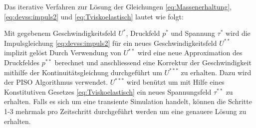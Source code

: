 Das iterative Verfahren zur Lösung der Gleichungen \eqref{eq:Massenerhaltung}, \eqref{eq:devss:impuls2} und \eqref{eq:Tviskoelastisch} lautet wie folgt:
\begin{outline}
    \1 Mit gegebenem Geschwindigkeitsfeld $U^*$, Druckfeld $p^*$ und Spannung $\tau^*$ wird die Impulsgleichung \eqref{eq:devss:impuls2} für ein neues Geschwindigkeitsfeld $U^{**}$ implizit gelöst
    \1 Durch Verwendung von $U^{**}$ wird eine neue Approximation des Druckfeldes $p^{**}$ berechnet und anschliessend eine Korrektur der Geschwindigkeit mithilfe der Kontinuitätsgleichung durchgeführt um $U^{***}$ zu erhalten. Dazu wird der PISO Algorithmus verwendet.
    \1 $U^{***}$ wird benützt um mit Hilfe eines Konstitutiven Gesetzes \eqref{eq:Tviskoelastisch} ein neues Spannungsfeld $\tau^{**}$ zu erhalten.
    \1 Falls es sich um eine transiente Simulation handelt, können die Schritte 1-3 mehrmals pro Zeitschritt durchgeführt werden um eine genauere Lösung zu erhalten.
\end{outline}
